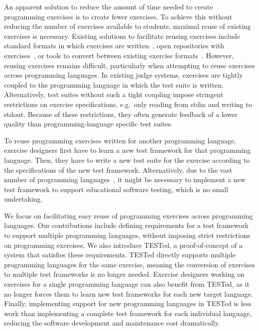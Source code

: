 \documentclass[../main]{subfiles}
\begin{document}
An apparent solution to reduce the amount of time needed to create programming exercises is to create fewer exercises.
To achieve this without reducing the number of exercises available to students, maximal reuse of existing exercises is necessary.
Existing solutions to facilitate reusing exercises include standard formats in which exercises are written~\autocite{paivaAnotherProgrammingExercises2020,verhoeffProgrammingTaskPackages2008}, open repositories with exercises~\autocite{staubitzRepositoryOpenAutogradable2017}, or tools to convert between existing exercise formats~\autocite{queirosBabeLOExtensibleConverter2013}.
However, reusing exercises remains difficult, particularly when attempting to reuse exercises across programming languages.
In existing judge systems, exercises are tightly coupled to the programming language in which the test suite is written.
Alternatively, test suites without such a tight coupling impose stringent restrictions on exercise specifications, e.g.\ only reading from stdin and writing to stdout.
Because of these restrictions, they often generate feedback of a lower quality than programming-language specific test suites.

To reuse programming exercises written for another programming language, exercise designers first have to learn a new test framework for that programming language.
Then, they have to write a new test suite for the exercise according to the specifications of the new test framework.
Alternatively, due to the vast number of programming languages~\autocite{bissyandePopularityInteroperabilityImpact2013}, it might be necessary to implement a new test framework to support educational software testing, which is no small undertaking.

We focus on facilitating easy reuse of programming exercises across programming languages.
Our contributions include defining requirements for a test framework to support multiple programming languages, without imposing strict restrictions on programming exercises.
We also introduce TESTed, a proof-of-concept of a system that satisfies these requirements.
TESTed directly supports multiple programming languages for the same exercise, meaning the conversion of exercises to multiple test frameworks is no longer needed.
Exercise designers working on exercises for a single programming language can also benefit from TESTed, as it no longer forces them to learn new test frameworks for each new target language.
Finally, implementing support for new programming languages in TESTed is less work than implementing a complete test framework for each individual language, reducing the software development and maintenance cost dramatically.
\end{document}
